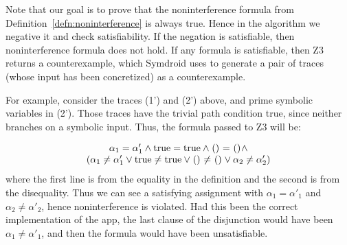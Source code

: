 \documentclass[10pt,conference,compsocconf]{IEEEtran}
\newcommand{\code}[1]{\text{\lstinline!#1!}}
\newcommand{\sfmt}[1]{\textsf{#1}}
\begin{document}
Note that our goal is to prove that the noninterference formula from
Definition~\ref{defn:noninterference} is always true. Hence in the
algorithm we negative it and check satisfiability. If the negation is
satisfiable, then noninterference formula does not hold.
If any formula is satisfiable, then Z3 returns a counterexample, which
Symdroid uses to generate a pair of traces (whose input has been
concretized) as a counterexample.

For example, consider the traces (1') and (2') above, and prime
symbolic variables in (2'). Those traces have the trivial path
condition \sfmt{true}, since neither branches on a symbolic
input. Thus, the formula passed to Z3 will be:

\begin{displaymath}
  \begin{array}{c}
    \alpha_1 = \alpha'_1 \land \code{true} = \code{true} \land \code{()} = \code{()}
    \land \\
    (\alpha_1 \neq \alpha'_1 \vee \code{true} \neq \code{true} \vee
    \code{()} \neq \code{()} \vee \alpha_2 \neq \alpha'_2)
  \end{array}
\end{displaymath}
where the first line is from the equality in the definition and the
second is from the disequality. Thus we can see a satisfying
assignment with $\alpha_1 = \alpha'_1$ and $\alpha_2 \neq \alpha'_2$,
hence noninterference is violated. Had this been the correct
implementation of the app, the last clause of the disjunction would
have been $\alpha_1 \neq \alpha'_1$, and then the formula would have
been unsatisfiable.




\end{document}
